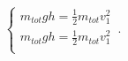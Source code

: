 \begin{equation}
    \begin{cases}
      m_{tot} g h = \frac{1}{2} m_{tot} v_1^2\\
       m_{tot} g h = \frac{1}{2} m_{tot} v_1^2\\
    \end{cases}\,.
\end{equation}